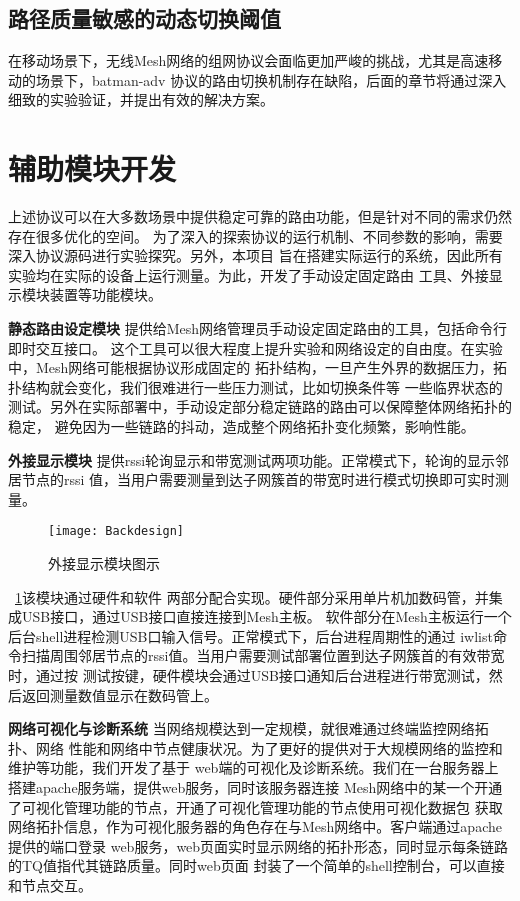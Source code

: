 \subsection{路径质量敏感的动态切换阈值}
    在移动场景下，无线Mesh网络的组网协议会面临更加严峻的挑战，尤其是高速移动的场景下，batman-adv
协议的路由切换机制存在缺陷，后面的章节将通过深入细致的实验验证，并提出有效的解决方案。

\section{辅助模块开发}
上述协议可以在大多数场景中提供稳定可靠的路由功能，但是针对不同的需求仍然存在很多优化的空间。
为了深入的探索协议的运行机制、不同参数的影响，需要深入协议源码进行实验探究。另外，本项目
旨在搭建实际运行的系统，因此所有实验均在实际的设备上运行测量。为此，开发了手动设定固定路由
工具、外接显示模块装置等功能模块。

\textbf{静态路由设定模块} 提供给Mesh网络管理员手动设定固定路由的工具，包括命令行即时交互接口。
这个工具可以很大程度上提升实验和网络设定的自由度。在实验中，Mesh网络可能根据协议形成固定的
拓扑结构，一旦产生外界的数据压力，拓扑结构就会变化，我们很难进行一些压力测试，比如切换条件等
一些临界状态的测试。另外在实际部署中，手动设定部分稳定链路的路由可以保障整体网络拓扑的稳定，
避免因为一些链路的抖动，造成整个网络拓扑变化频繁，影响性能。

\textbf{外接显示模块} 提供rssi轮询显示和带宽测试两项功能。正常模式下，轮询的显示邻居节点的rssi
值，当用户需要测量到达子网簇首的带宽时进行模式切换即可实时测量。

\begin{figure}[H]
  \centering
  \texttt{[image: Backdesign]}
  \caption{外接显示模块图示}
  \label{fig:backdesign}
\end{figure}

~\ref{fig:backdesign}该模块通过硬件和软件
两部分配合实现。硬件部分采用单片机加数码管，并集成USB接口，通过USB接口直接连接到Mesh主板。
软件部分在Mesh主板运行一个后台shell进程检测USB口输入信号。正常模式下，后台进程周期性的通过
iwlist命令扫描周围邻居节点的rssi值。当用户需要测试部署位置到达子网簇首的有效带宽时，通过按
测试按键，硬件模块会通过USB接口通知后台进程进行带宽测试，然后返回测量数值显示在数码管上。

\textbf{网络可视化与诊断系统} 当网络规模达到一定规模，就很难通过终端监控网络拓扑、网络
性能和网络中节点健康状况。为了更好的提供对于大规模网络的监控和维护等功能，我们开发了基于
web端的可视化及诊断系统。我们在一台服务器上搭建apache服务端，提供web服务，同时该服务器连接
Mesh网络中的某一个开通了可视化管理功能的节点，开通了可视化管理功能的节点使用可视化数据包
获取网络拓扑信息，作为可视化服务器的角色存在与Mesh网络中。客户端通过apache提供的端口登录
web服务，web页面实时显示网络的拓扑形态，同时显示每条链路的TQ值指代其链路质量。同时web页面
封装了一个简单的shell控制台，可以直接和节点交互。














